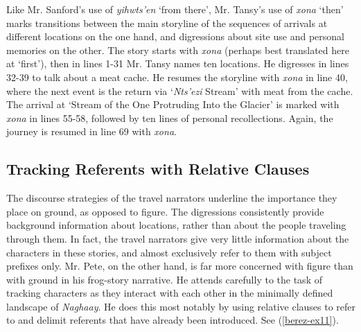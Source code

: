 Like Mr. Sanford’s use of \textit{yihwts’en} ‘from there’, Mr. Tansy’s use of \textit{xona} ‘then’ marks transitions between the main storyline of the sequences of arrivals at different locations on the one hand, and digressions about site use and personal memories on the other. The story starts with \textit{xona} (perhaps best translated here at ‘first’), then in lines 1-31 Mr. Tansy names ten locations. He digresses in lines 32-39 to talk about a meat cache. He resumes the storyline with \textit{xona} in line 40, where the next event is the return via ‘\textit{Nts’ezi} Stream’ with meat from the cache. The arrival at ‘Stream of the One Protruding Into the Glacier’ is marked with \textit{xona} in lines 55-58, followed by ten lines of personal recollections. Again, the journey is resumed in line 69 with \textit{xona}.

\subsection{Tracking Referents with Relative Clauses}

The discourse strategies of the travel narrators underline the importance they place on ground, as opposed to figure. The digressions consistently provide background information about locations, rather than about the people traveling through them. In fact, the travel narrators give very little information about the characters in these stories, and almost exclusively refer to them with subject prefixes only. Mr. Pete, on the other hand, is far more concerned with figure than with ground in his frog-story narrative. He attends carefully to the task of tracking characters as they interact with each other in the minimally defined landscape of \textit{Naghaay}. He does this most notably by using relative clauses to refer to and delimit referents that have already been introduced. See (\ref{berez-ex11}).

